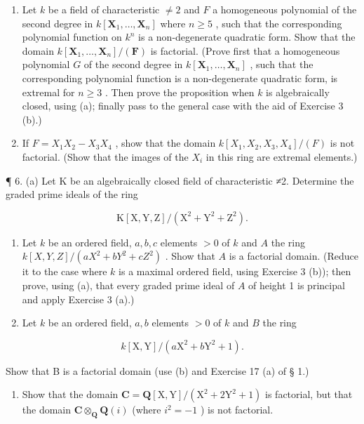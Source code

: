 \begin{enumerate}
\def\labelenumi{(\alph{enumi})}
\setcounter{enumi}{1}
\item
  Let \(k\) be a field of characteristic \(\neq 2\) and \(F\) a homogeneous polynomial of the second degree in \(k[\mathbf{X}_1, \ldots, \mathbf{X}_n]\) where \(n \geqslant 5\) , such that the corresponding polynomial function on \(k^n\) is a non-degenerate quadratic form. Show that the domain \(k[\mathbf{X}_1, \ldots, \mathbf{X}_n] / (\mathbf{F})\) is factorial. (Prove first that a homogeneous polynomial \(G\) of the second degree in \(k[\mathbf{X}_1, \ldots, \mathbf{X}_n]\) , such that the corresponding polynomial function is a non-degenerate quadratic form, is extremal for \(n \geqslant 3\) . Then prove the proposition when \(k\) is algebraically closed, using (a); finally pass to the general case with the aid of Exercise 3 (b).)
\item
  If \(F = X_{1}X_{2} - X_{3}X_{4}\) , show that the domain \(k[X_{1}, X_{2}, X_{3}, X_{4}]/(F)\) is not factorial. (Show that the images of the \(X_{i}\) in this ring are extremal elements.)
\end{enumerate}

¶ 6. (a) Let K be an algebraically closed field of characteristic ≠2. Determine the graded prime ideals of the ring

\[
\mathrm{K} [ \mathrm{X}, \mathrm{Y}, \mathrm{Z} ] / (\mathrm{X} ^ {2} + \mathrm{Y} ^ {2} + \mathrm{Z} ^ {2}).
\]

\begin{enumerate}
\def\labelenumi{(\alph{enumi})}
\setcounter{enumi}{1}
\item
  Let \(k\) be an ordered field, \(a, b, c\) elements \(>0\) of \(k\) and \(A\) the ring \(k[X, Y, Z] / (aX^2 + bY^2 + cZ^2)\) . Show that \(A\) is a factorial domain. (Reduce it to the case where \(k\) is a maximal ordered field, using Exercise 3 (b)); then prove, using (a), that every graded prime ideal of \(A\) of height 1 is principal and apply Exercise 3 (a).)
\item
  Let \(k\) be an ordered field, \(a, b\) elements \(> 0\) of \(k\) and \(B\) the ring
\end{enumerate}

\[
k [ \mathrm{X}, \mathrm{Y} ] / (a \mathrm{X} ^ {2} + b \mathrm{Y} ^ {2} + 1).
\]

Show that B is a factorial domain (use (b) and Exercise 17 (a) of § 1.)

\begin{enumerate}
\def\labelenumi{(\alph{enumi})}
\setcounter{enumi}{3}
\tightlist
\item
  Show that the domain \(\mathbf{C} = \mathbf{Q}[\mathrm{X},\mathrm{Y}] / (\mathrm{X}^2 +2\mathrm{Y}^2 +1)\) is factorial, but that the domain \(\mathbf{C}\otimes_{\mathbf{Q}}\mathbf{Q}(i)\) (where \(i^2 = -1\) ) is not factorial.
\end{enumerate}

